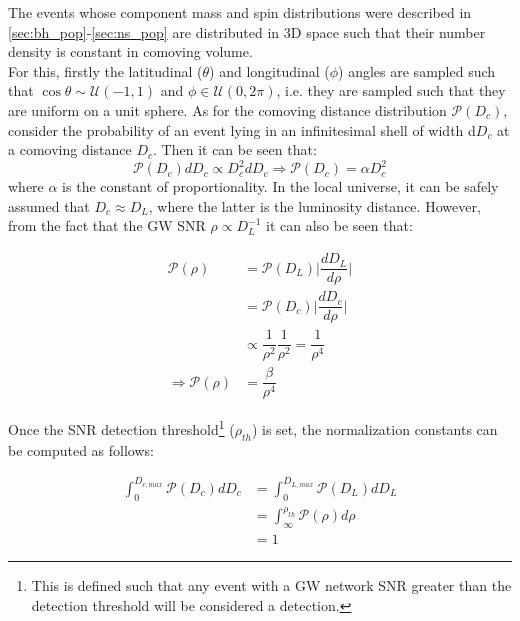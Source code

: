         The events whose component mass and spin distributions were described in
        \ref{sec:bh_pop}-\ref{sec:ns_pop} are distributed in 3D space such that their
        number density is constant in comoving volume.\\
        For this, firstly the latitudinal ($\theta$) and longitudinal ($\phi$) angles
        are sampled such that $\cos \theta \sim \mathcal{U}(-1, 1)$ and $\phi \in
        \mathcal{U}(0, 2\pi)$, i.e. they are sampled such that they are uniform on a
        unit sphere. As for the comoving distance distribution $\mathcal{P}(D_c)$,
        consider the probability of an event lying in an infinitesimal shell of width
        d$D_c$ at a comoving distance $D_c$.  Then it can be seen that:
        \begin{equation}
            \mathcal{P}(D_c) dD_c \propto D_c^2 dD_c \Rightarrow
                \boxed{\mathcal{P}(D_c) = \alpha D_c^2}
        \end{equation}
        where $\alpha$ is the constant of proportionality. In the local universe, it can
        be safely assumed that $D_c \approx D_L$, where the latter is the luminosity
        distance.  However, from the fact that the GW SNR $\rho \propto D_L^{-1}$ it can
        also be seen that:

        \begin{align}
            \mathcal{P}(\rho) &= \mathcal{P}(D_L)
                                  \Big \lvert \dfrac{dD_L}{d\rho} \Big \rvert \\
                              &= \mathcal{P}({D_c})
                                  \Big \lvert \dfrac{dD_c}{d\rho} \Big \rvert \\
                              &\propto \dfrac{1}{\rho^2} \dfrac{1}{\rho^2}
                                  = \dfrac{1}{\rho^4} \nonumber\\
            \Rightarrow \mathcal{P} (\rho) &= \dfrac{\beta}{\rho^4}
        \end{align}

        Once the SNR detection threshold\footnote{
            This is defined such that any event with a GW network SNR greater than the
            detection threshold will be considered a detection.
        } ($\rho_{th}$) is set, the normalization constants can be computed as follows:

        \begin{align}
            \int_0^{D_{c, max}}
                \mathcal{P}(D_c) dD_c &= \int_0^{D_{L, max}} \mathcal{P}(D_L) dD_L \\
                                      &= \int_\infty^{\rho_{th}} \mathcal{P}(\rho)
                                          d\rho \\
                                      &= 1
        \end{align}

